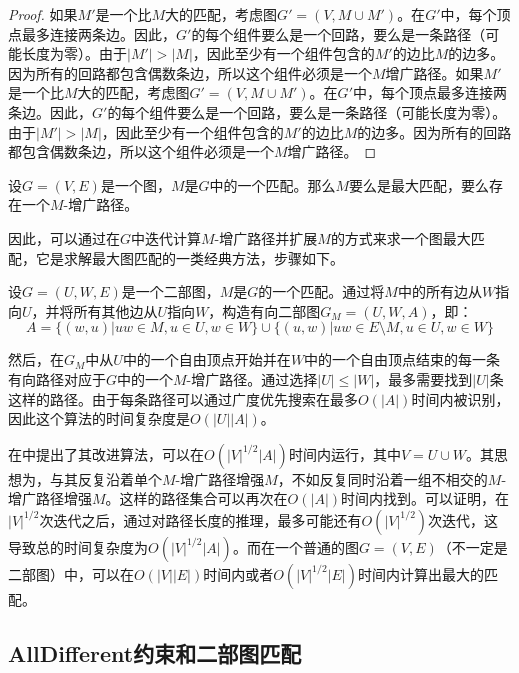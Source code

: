 \begin{proof}
如果$M'$是一个比$M$大的匹配，考虑图$G' = (V, M \cup M')$。在$G'$中，每个顶点最多连接两条边。因此，$G'$的每个组件要么是一个回路，要么是一条路径（可能长度为零）。由于$|M'| > |M|$，因此至少有一个组件包含的$M'$的边比$M$的边多。因为所有的回路都包含偶数条边，所以这个组件必须是一个$M$增广路径。如果$M'$是一个比$M$大的匹配，考虑图$G' = (V, M \cup M')$。在$G'$中，每个顶点最多连接两条边。因此，$G'$的每个组件要么是一个回路，要么是一条路径（可能长度为零）。由于$|M'| > |M|$，因此至少有一个组件包含的$M'$的边比$M$的边多。因为所有的回路都包含偶数条边，所以这个组件必须是一个$M$增广路径。
\end{proof}

\begin{theorem}
   设$G = (V, E)$是一个图，$M$是$G$中的一个匹配。那么$M$要么是最大匹配，要么存在一个$M$-增广路径。
\end{theorem}

因此，可以通过在$G$中迭代计算$M$-增广路径并扩展$M$的方式来求一个图最大匹配，它是求解最大图匹配的一类经典方法，步骤如下。

设$G = (U, W, E)$是一个二部图，$M$是$G$的一个匹配。通过将$M$中的所有边从$W$指向$U$，并将所有其他边从$U$指向$W$，构造有向二部图$G_M = (U, W, A)$，即：
\begin{equation*}
    A = \{(w, u) | uw \in M, u \in U, w \in W \} \cup \{(u, w) | uw \in E \setminus M, u \in U, w \in W \}
\end{equation*}

然后，在$G_M$中从$U$中的一个自由顶点开始并在$W$中的一个自由顶点结束的每一条有向路径对应于$G$中的一个$M$-增广路径。通过选择$|U| \leq |W|$，最多需要找到$|U|$条这样的路径。由于每条路径可以通过广度优先搜索在最多$O(|A|)$时间内被识别，因此这个算法的时间复杂度是$O(|U||A|)$。

在\cite{hopcroft1973n}中提出了其改进算法，可以在$O(|V|^{1/2}|A|)$时间内运行，其中$V = U \cup W$。其思想为，与其反复沿着单个$M$-增广路径增强$M$，不如反复同时沿着一组不相交的$M$-增广路径增强$M$。这样的路径集合可以再次在$O(|A|)$时间内找到。可以证明，在$|V|^{1/2}$次迭代之后，通过对路径长度的推理，最多可能还有$O(|V|^{1/2})$次迭代，这导致总的时间复杂度为$O(|V|^{1/2}|A|)$。而在一个普通的图$G = (V, E)$（不一定是二部图）中，可以在$O(|V||E|)$时间内\cite{edmonds1965paths}或者$O(|V|^{1/2}|E|)$时间内\cite{micali1980v}计算出最大的匹配。

\subsection{AllDifferent约束和二部图匹配}

